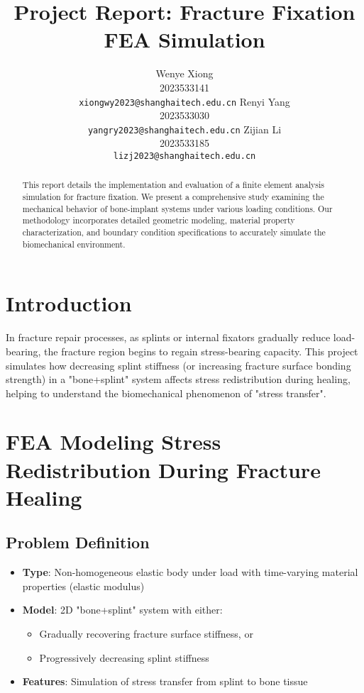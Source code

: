 \documentclass{article}
\title{Project Report: Fracture Fixation FEA Simulation}
\author{
  Wenye Xiong \\
  2023533141 \\
  \texttt{xiongwy2023@shanghaitech.edu.cn}
  \And
  Renyi Yang \\
  2023533030 \\
  \texttt{yangry2023@shanghaitech.edu.cn}
  \AND
  Zijian Li \\
  2023533185 \\
  \texttt{lizj2023@shanghaitech.edu.cn}
}
\begin{document}
\maketitle

\begin{abstract}
  This report details the implementation and evaluation of a finite element analysis simulation for fracture fixation. We present a comprehensive study examining the mechanical behavior of bone-implant systems under various loading conditions. Our methodology incorporates detailed geometric modeling, material property characterization, and boundary condition specifications to accurately simulate the biomechanical environment.
\end{abstract}



\section{Introduction}

In fracture repair processes, as splints or internal fixators gradually reduce load-bearing, the fracture region begins to regain stress-bearing capacity. This project simulates how decreasing splint stiffness (or increasing fracture surface bonding strength) in a "bone+splint" system affects stress redistribution during healing, helping to understand the biomechanical phenomenon of "stress transfer".

\section{FEA Modeling Stress Redistribution During Fracture Healing}

\subsection{Problem Definition}
\begin{itemize}
  \item \textbf{Type}: Non-homogeneous elastic body under load with time-varying material properties (elastic modulus)
  \item \textbf{Model}: 2D "bone+splint" system with either:
    \begin{itemize}
      \item Gradually recovering fracture surface stiffness, or
      \item Progressively decreasing splint stiffness
    \end{itemize}
  \item \textbf{Features}: Simulation of stress transfer from splint to bone tissue
\end{itemize}
\end{document}
